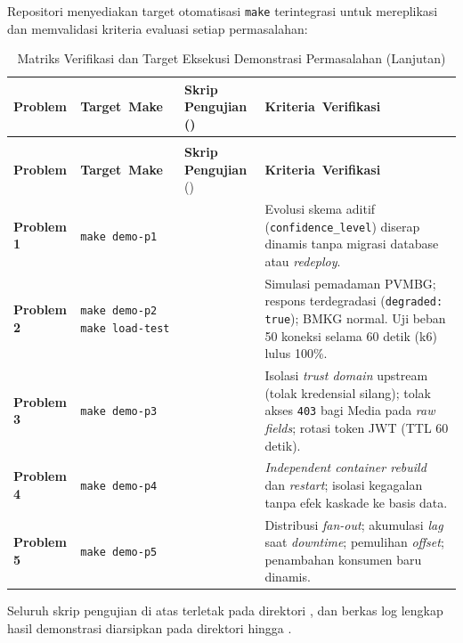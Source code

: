 Repositori menyediakan target otomatisasi \texttt{make} terintegrasi untuk mereplikasi dan memvalidasi kriteria evaluasi setiap permasalahan:

\begin{singlespacing}
\begin{footnotesize}
\begin{xltabular}{\textwidth}{l p{2.5cm} p{5.0cm} X}
\caption{Matriks Verifikasi dan Target Eksekusi Demonstrasi Permasalahan} \label{tab:runbook_matrix} \\
\toprule
\textbf{Problem} & \mbox{\textbf{Target Make}} & \textbf{Skrip Pengujian} \newline \scriptsize{()} & \mbox{\textbf{Kriteria Verifikasi}} \\
\midrule
\endfirsthead
\caption[]{Matriks Verifikasi dan Target Eksekusi Demonstrasi Permasalahan (Lanjutan)} \\
\toprule
\textbf{Problem} & \mbox{\textbf{Target Make}} & \textbf{Skrip Pengujian} \newline \scriptsize{()} & \mbox{\textbf{Kriteria Verifikasi}} \\
\midrule
\endhead
\bottomrule
\endfoot
\textbf{Problem 1} & \texttt{make demo-p1} &  & Evolusi skema aditif (\texttt{confidence\_level}) diserap dinamis tanpa migrasi database atau \textit{redeploy}. \\
\addlinespace
\textbf{Problem 2} & \texttt{make demo-p2} \newline \texttt{make load-test} &  \newline {} & Simulasi pemadaman PVMBG; respons terdegradasi (\texttt{degraded: true}); BMKG normal. Uji beban 50 koneksi selama 60 detik (k6) lulus 100\%. \\
\addlinespace
\textbf{Problem 3} & \texttt{make demo-p3} &  \newline {} & Isolasi \textit{trust domain} upstream (tolak kredensial silang); tolak akses \texttt{403} bagi Media pada \textit{raw fields}; rotasi token JWT (TTL 60 detik). \\
\addlinespace
\textbf{Problem 4} & \texttt{make demo-p4} &  & \textit{Independent container rebuild} dan \textit{restart}; isolasi kegagalan tanpa efek kaskade ke basis data. \\
\addlinespace
\textbf{Problem 5} & \texttt{make demo-p5} &  & Distribusi \textit{fan-out}; akumulasi \textit{lag} saat \textit{downtime}; pemulihan \textit{offset}; penambahan konsumen baru dinamis. \\
\end{xltabular}
\end{footnotesize}
\end{singlespacing}

\noindent Seluruh skrip pengujian di atas terletak pada direktori , dan berkas log lengkap hasil demonstrasi diarsipkan pada direktori  hingga .
